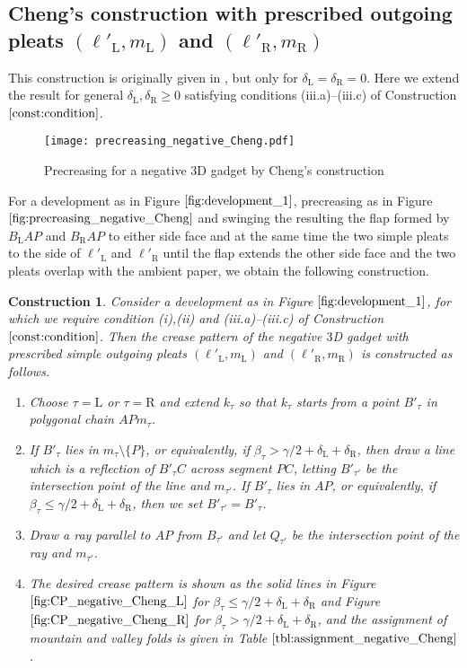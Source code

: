 \documentclass[11pt]{amsart}
\newtheorem{construction}[theorem]{Construction}
\numberwithin{equation}{section}
\numberwithin{theorem}{section}
\newcommand{\Lt}{\ensuremath{\mathrm{L}}}
\newcommand{\Rt}{\ensuremath{\mathrm{R}}}
\begin{document}
\subsection{Cheng's construction with prescribed outgoing pleats $(\ell'_\Lt ,m_\Lt )$ and $(\ell'_\Rt ,m_\Rt )$}\label{subsec:negative_Cheng}
This construction is originally given in \cite{Cheng}, but only for $\delta_\Lt =\delta_\Rt =0$. 
Here we extend the result for general $\delta_\Lt ,\delta_\Rt\geqslant 0$ satisfying conditions (iii.a)--(iii.c) of Construction $\ref{const:condition}$.
\begin{figure}[htbp]
\addtocounter{theorem}{1}
\centering\texttt{[image: precreasing\_negative\_Cheng.pdf]}
    \caption{Precreasing for a negative $3$D gadget by Cheng's construction}
    \label{fig:precreasing_negative_Cheng}
\end{figure}
For a development as in Figure $\ref{fig:development_1}$, precreasing as in Figure $\ref{fig:precreasing_negative_Cheng}$ and swinging the resulting the flap
formed by $B_\Lt AP$ and $B_\Rt AP$ to either side face and at the same time the two simple pleats to the side of $\ell'_\Lt$ and $\ell'_\Rt$
until the flap extends the other side face and the two pleats overlap with the ambient paper, we obtain the following construction.
\begin{construction}\label{const:negative_Cheng}\rm
Consider a development as in Figure $\ref{fig:development_1}$, 
for which we require condition (i),(ii) and (iii.a)--(iii.c) of Construction $\ref{const:condition}$.
Then the crease pattern of the negative $3$D gadget with prescribed simple outgoing pleats $(\ell'_\Lt ,m_\Lt )$ and $(\ell'_\Rt ,m_\Rt )$
is constructed as follows.
\begin{enumerate}[(1)]
\item Choose $\tau =\Lt$ or $\tau =\Rt$ and extend $k_\tau$ so that $k_\tau$ starts from a point $B'_\tau$ in polygonal chain $APm_\tau$.
\item If $B'_\tau$ lies in $m_\tau\setminus\{ P\}$, or equivalently, if $\beta_\tau >\gamma /2+\delta_\Lt +\delta_\Rt$, then
draw a line which is a reflection of $B'_\tau C$ across segment $PC$, letting $B'_{\tau'}$ be the intersection point of the line and $m_{\tau'}$.
If $B'_\tau$ lies in $AP$, or equivalently, if $\beta_\tau\leqslant\gamma /2+\delta_\Lt +\delta_\Rt$, then we set $B'_{\tau'}=B'_\tau$.
\item Draw a ray parallel to $AP$ from $B_{\tau'}$ and let $Q_{\tau'}$ be the intersection point of the ray and $m_{\tau'}$.
\item The desired crease pattern is shown as the solid lines in Figure $\ref{fig:CP_negative_Cheng_L}$ for $\beta_\tau\leqslant\gamma /2+\delta_\Lt +\delta_\Rt$
and Figure $\ref{fig:CP_negative_Cheng_R}$ for $\beta_\tau >\gamma /2+\delta_\Lt +\delta_\Rt$,
and the assignment of mountain and valley folds is given in Table $\ref{tbl:assignment_negative_Cheng}$.
\end{enumerate}
\end{construction}
\end{document}
